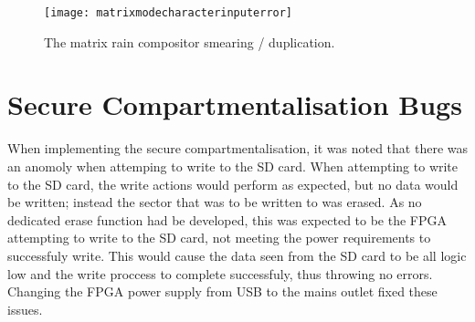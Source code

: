 \begin{figure}
  \centering
  \texttt{[image: matrixmodecharacterinputerror]}
  \caption{The matrix rain compositor smearing / duplication.}
  \label{fig:matrixmodecharacterinputerror}
\end{figure}


\section{Secure Compartmentalisation Bugs}

\label{Ch7 Sec2}

When implementing the secure compartmentalisation, it was noted that there was an anomoly when attemping to write to the SD card. When attempting to write to the SD card, the write actions would perform as expected, but no data would be written; instead the sector that was to be written to was erased. As no dedicated erase function had be developed, this was expected to be the FPGA attempting to write to the SD card, not meeting the power requirements to successfuly write. This would cause the data seen from the SD card to be all logic low and the write proccess to complete successfuly, thus throwing no errors. Changing the FPGA power supply from USB to the mains outlet fixed these issues.
